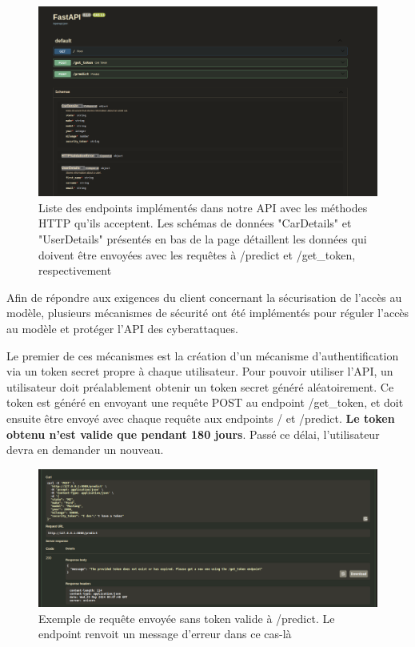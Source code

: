 \documentclass[french]{article}
\begin{document}
    \begin{figure}[h!]
        \includegraphics[width=12cm]{api_endpoints}
        \centering
        \caption{Liste des endpoints implémentés dans notre API avec les méthodes HTTP qu'ils acceptent. Les schémas de données "CarDetails" et "UserDetails" présentés en bas de la page détaillent les données qui doivent être envoyées avec les requêtes à /predict et /get\_token, respectivement}
        \centering
    \end{figure}
    Afin de répondre aux exigences du client concernant la sécurisation de l'accès au modèle, plusieurs mécanismes de sécurité ont été implémentés pour réguler l'accès au modèle et protéger l'API des cyberattaques. 
    
    Le premier de ces mécanismes est la création d'un mécanisme d'authentification via un token secret propre à chaque utilisateur. Pour pouvoir utiliser l'API, un utilisateur doit préalablement obtenir un token secret généré aléatoirement. Ce token est généré en envoyant une requête POST au endpoint /get\_token, et doit ensuite être envoyé avec chaque requête aux endpoints / et /predict. \textbf{Le token obtenu n'est valide que pendant 180 jours}. Passé ce délai, l'utilisateur devra en demander un nouveau.

    \begin{figure}[h!]
        \includegraphics[width=12cm]{api_1}
        \centering
        \caption{Exemple de requête envoyée sans token valide à /predict. Le endpoint renvoit un message d'erreur dans ce cas-là}
        \centering
    \end{figure}
\end{document}
